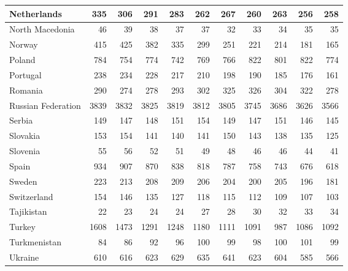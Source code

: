 \begin{table}
\begin{tabular}{|l|r|r|r|r|r|r|r|r|r|r|}
                   Netherlands&    335&    306&    291&    283&    262&    267&    260&    263&    256&    258\\\hline
               North Macedonia&     46&     39&     38&     37&     37&     32&     33&     34&     35&     35\\\hline
                        Norway&    415&    425&    382&    335&    299&    251&    221&    214&    181&    165\\\hline
                        Poland&    784&    754&    774&    742&    769&    766&    822&    801&    822&    774\\\hline
                      Portugal&    238&    234&    228&    217&    210&    198&    190&    185&    176&    161\\\hline
                       Romania&    290&    274&    278&    293&    302&    325&    326&    304&    322&    278\\\hline
            Russian Federation&   3839&   3832&   3825&   3819&   3812&   3805&   3745&   3686&   3626&   3566\\\hline
                        Serbia&    149&    147&    148&    151&    154&    149&    147&    151&    146&    145\\\hline
                      Slovakia&    153&    154&    141&    140&    141&    150&    143&    138&    135&    125\\\hline
                      Slovenia&     55&     56&     52&     51&     49&     48&     46&     46&     44&     41\\\hline
                         Spain&    934&    907&    870&    838&    818&    787&    758&    743&    676&    618\\\hline
                        Sweden&    223&    213&    208&    209&    206&    204&    200&    205&    196&    181\\\hline
                   Switzerland&    154&    146&    135&    127&    118&    115&    112&    109&    107&    103\\\hline
                    Tajikistan&     22&     23&     24&     24&     27&     28&     30&     32&     33&     34\\\hline
                        Turkey&   1608&   1473&   1291&   1248&   1180&   1111&   1091&    987&   1086&   1092\\\hline
                  Turkmenistan&     84&     86&     92&     96&    100&     99&     98&    100&    101&     99\\\hline
                       Ukraine&    610&    616&    623&    629&    635&    641&    623&    604&    585&    566\\\hline

\end{tabular}
\end{table}
